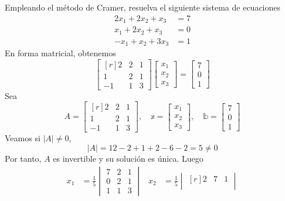 \begin{example}
    Empleando el método de Cramer, resuelva el siguiente sistema de ecuaciones
    \begin{align*}
        2x_1 + 2x_2 + x_3 & = 7 \\
        x_1 + 2x_2 + x_3 & = 0 \\
        -x_1 + x_2 + 3x_3 & = 1
    \end{align*}
    \solucion En forma matricial, obtenemos
    $$\begin{bmatrix*}[r]
        2 & 2 & 1 \\
        1 & 2 & 1 \\
        -1 & 1 & 3
    \end{bmatrix*} \begin{bmatrix}
        x_1 \\
        x_2 \\
        x_3
    \end{bmatrix} = \begin{bmatrix}
        7 \\
        0 \\
        1
    \end{bmatrix}$$
    Sea
    $$A = \begin{bmatrix*}[r]
        2 & 2 & 1 \\
        1 & 2 & 1 \\
        -1 & 1 & 3
    \end{bmatrix*}, \quad \mathbb{x} = \begin{bmatrix}
        x_1 \\
        x_2 \\
        x_3
    \end{bmatrix}, \quad \mathbb{b} = \begin{bmatrix}
        7 \\
        0 \\
        1
    \end{bmatrix}$$
    Veamos si $|A| \neq 0$,
    $$|A| = 12-2+1+2-6-2 = 5 \neq 0$$
    Por tanto, $A$ es invertible y su solución es única. Luego
    \begin{align*}
        x_1 & = \frac{1}{5} \begin{vmatrix}
            7 & 2 & 1 \\
            0 & 2 & 1 \\
            1 & 1 & 3
        \end{vmatrix} & x_2 & = \frac{1}{5} \begin{vmatrix*}[r]
            2 & 7 & 1 \\

\end{vmatrix*}
\end{align*}
\end{example}
